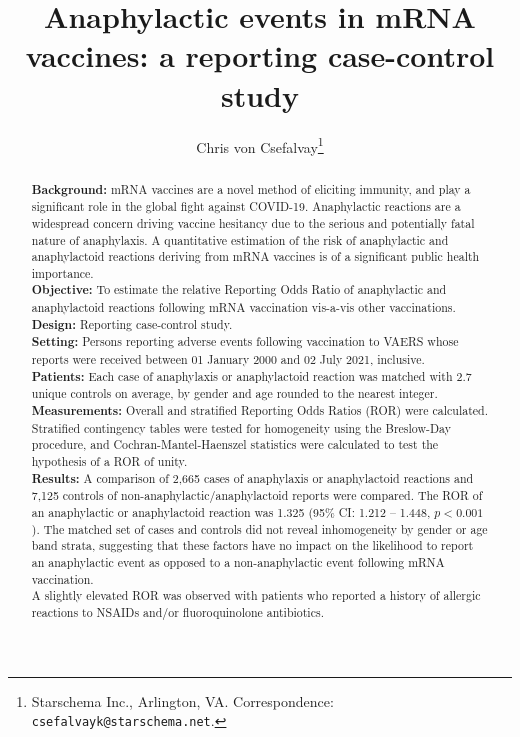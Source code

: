 \documentclass{article}
\title{Anaphylactic events in mRNA vaccines: a reporting case-control study}
\author{Chris von Csefalvay\thanks{Starschema Inc., Arlington, VA. Correspondence: \texttt{csefalvayk@starschema.net}.}}
\begin{document}
\maketitle

\onehalfspacing

\begin{abstract}
    \textbf{Background:}
        mRNA vaccines are a novel method of eliciting immunity, and play a significant role in the global fight against COVID-19.
        Anaphylactic reactions are a widespread concern driving vaccine hesitancy due to the serious and potentially fatal nature of anaphylaxis.
        A quantitative estimation of the risk of anaphylactic and anaphylactoid reactions deriving from mRNA vaccines is of a significant public health importance. \\
    \textbf{Objective:}
        To estimate the relative Reporting Odds Ratio of anaphylactic and anaphylactoid reactions following mRNA vaccination vis-a-vis other vaccinations. \\
    \textbf{Design:}
        Reporting case-control study. \\
    \textbf{Setting:}
        Persons reporting adverse events following vaccination to VAERS whose reports were received between 01 January 2000 and 02 July 2021, inclusive. \\
    \textbf{Patients:}
        Each case of anaphylaxis or anaphylactoid reaction was matched with 2.7 unique controls on average, by gender and age rounded to the nearest integer. \\
    \textbf{Measurements:}
        Overall and stratified Reporting Odds Ratios (ROR) were calculated.
        Stratified contingency tables were tested for homogeneity using the Breslow-Day procedure, and Cochran-Mantel-Haenszel statistics were calculated to test the hypothesis of a ROR of unity. \\
    \textbf{Results:}
        A comparison of 2,665 cases of anaphylaxis or anaphylactoid reactions and 7,125 controls of non-anaphylactic/anaphylactoid reports were compared.
        The ROR of an anaphylactic or anaphylactoid reaction was 1.325 (95\% CI: 1.212 -- 1.448, $p < 0.001$).
        The matched set of cases and controls did not reveal inhomogeneity by gender or age band strata, suggesting that these factors have no impact on the likelihood to report an anaphylactic event as opposed to a non-anaphylactic event following mRNA vaccination. \\
        A slightly elevated ROR was observed with patients who reported a history of allergic reactions to NSAIDs and/or fluoroquinolone antibiotics.

\end{abstract}
\end{document}
